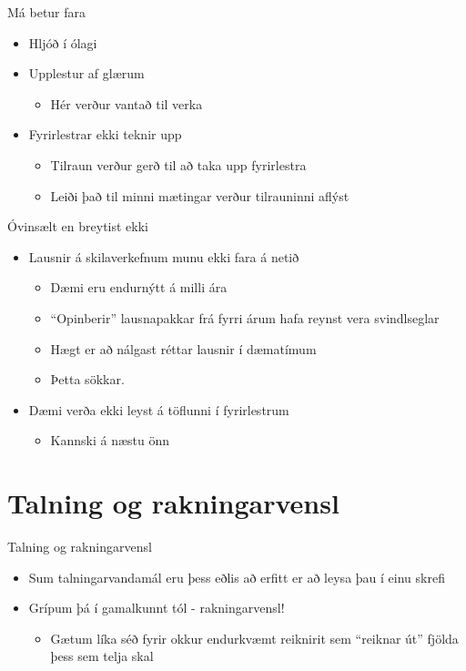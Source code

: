 \documentclass[handout]{beamer}
\begin{document}
\begin{frame}{Má betur fara}
\begin{itemize}
 \item Hljóð í ólagi
 \item Upplestur af glærum \pause
 \begin{itemize}
  \item Hér verður vantað til verka
 \end{itemize}
 \item Fyrirlestrar ekki teknir upp
 \begin{itemize}
  \item Tilraun verður gerð til að taka upp fyrirlestra
  \item Leiði það til minni mætingar verður tilrauninni aflýst
 \end{itemize}
\end{itemize}
\end{frame}

\begin{frame}{Óvinsælt en breytist ekki}
\begin{itemize}
 \item Lausnir á skilaverkefnum munu ekki fara á netið
 \begin{itemize}
  \item Dæmi eru endurnýtt á milli ára
  \item ``Opinberir'' lausnapakkar frá fyrri árum hafa reynst vera svindlseglar
  \item Hægt er að nálgast réttar lausnir í dæmatímum
  \item Þetta sökkar.
 \end{itemize}
 \item Dæmi verða ekki leyst á töflunni í fyrirlestrum
 \begin{itemize}
  \item Kannski á næstu önn
 \end{itemize}
\end{itemize}
\end{frame}

\section{Talning og rakningarvensl}

\begin{frame}{Talning og rakningarvensl}
\begin{itemize}
 \item Sum talningarvandamál eru þess eðlis að erfitt er að leysa þau í einu skrefi
 \item Grípum þá í gamalkunnt tól - rakningarvensl!
 \begin{itemize}
  \item Gætum líka séð fyrir okkur endurkvæmt reiknirit sem ``reiknar út'' fjölda þess sem telja skal
 \end{itemize}
\end{itemize}
\end{frame}
\end{document}
